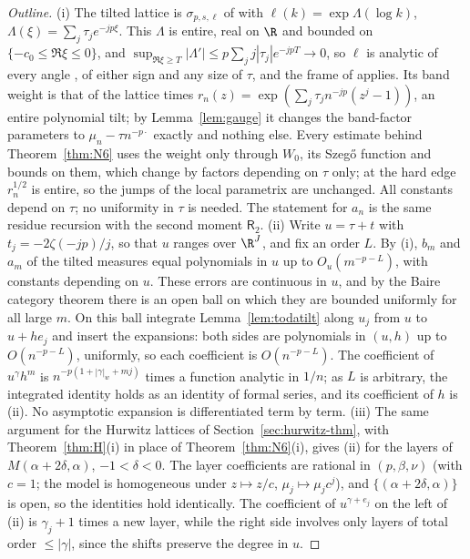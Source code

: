 \begin{proof}[Outline]
(i) The tilted lattice is $\sigma_{p,s,\ell}$ of \cite{PaperII} with $\ell(k)=\exp\Lambda(\log k)$, $\Lambda(\xi)=\sum_j\tau_je^{-jp\xi}$. This
$\Lambda$ is entire, real on $\R$ and bounded on $\{-c_0\le\Re\xi\le0\}$, and $\sup_{\Re\xi\ge T}|\Lambda'|\le p\sum_jj|\tau_j|e^{-jpT}\to0$, so $\ell$
is analytic of every angle \cite[Definition~1.1]{PaperII}, of either sign and any size of $\tau$, and the frame of \cite{PaperII} applies. Its
band weight is that of the lattice times $r_n(z)=\exp(\sum_j\tau_jn^{-jp}(z^j-1))$, an entire polynomial tilt; by Lemma~\ref{lem:gauge}
it changes the band-factor parameters to $\mu_n-\tau n^{-p\cdot}$ exactly and nothing else. Every estimate behind Theorem~\ref{thm:N6}
uses the weight only through $W_0$, its Szeg\H{o} function and bounds on them, which change by factors depending on $\tau$ only; at
the hard edge $r_n^{1/2}$ is entire, so the jumps of the local parametrix are unchanged. All constants depend on $\tau$; no uniformity in
$\tau$ is needed. The statement for $a_n$ is the same residue recursion with the second moment $\mathsf R_2$.
(ii) Write $u=\tau+t$ with $t_j=-2\zeta(-jp)/j$, so that $u$ ranges over $\R^J$, and fix an order $L$. By (i), $b_m$ and $a_m$ of the tilted
measures equal polynomials in $u$ up to $O_u(m^{-p-L})$, with constants depending on $u$. These errors are continuous in $u$, and by the
Baire category theorem there is an open ball on which they are bounded uniformly for all large $m$. On this ball integrate
Lemma~\ref{lem:todatilt} along $u_j$ from $u$ to $u+he_j$ and insert the expansions: both sides are polynomials in $(u,h)$ up to
$O(n^{-p-L})$, uniformly, so each coefficient is $O(n^{-p-L})$. The coefficient of $u^\gamma h^m$ is $n^{-p(1+|\gamma|_w+mj)}$ times a
function analytic in $1/n$; as $L$ is arbitrary, the integrated identity holds as an identity of formal series, and its coefficient of $h$ is
(ii). No asymptotic expansion is differentiated term by term.
(iii) The same argument for the Hurwitz lattices of Section~\ref{sec:hurwitz-thm}, with Theorem~\ref{thm:H}(i) in place of
Theorem~\ref{thm:N6}(i), gives (ii) for the layers of $M(\alpha+2\delta,\alpha)$, $-1<\delta<0$. The layer coefficients are rational in
$(p,\beta,\nu)$ (with $c=1$; the model is homogeneous under $z\mapsto z/c$, $\mu_j\mapsto\mu_jc^j$), and $\{(\alpha+2\delta,\alpha)\}$ is open,
so the identities hold identically. The coefficient of $u^{\gamma+e_j}$ on the left of (ii) is $\gamma_j+1$ times a new layer, while the
right side involves only layers of total order $\le|\gamma|$, since the shifts preserve the degree in $u$.
\end{proof}

